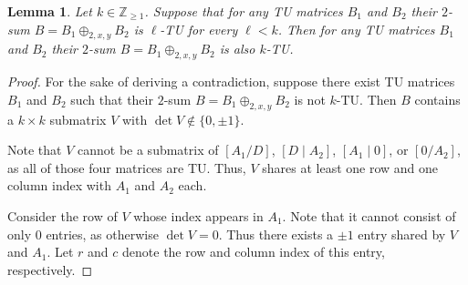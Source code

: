\documentclass{article}
\newtheorem{lemma}{Lemma}
\theoremstyle{definition}
\begin{document}
\begin{lemma}\label{lem:two_sum_k_tu_induction}
    Let $k \in \mathbb{Z}_{\geq 1}$. Suppose that for any TU matrices $B_{1}$ and $B_{2}$ their $2$-sum $B = B_{1} \oplus_{2, x, y} B_{2}$ is $\ell$-TU for every $\ell < k$. Then for any TU matrices $B_{1}$ and $B_{2}$ their $2$-sum $B = B_{1} \oplus_{2, x, y} B_{2}$ is also $k$-TU.
\end{lemma}

\begin{proof}
    For the sake of deriving a contradiction, suppose there exist TU matrices $B_{1}$ and $B_{2}$ such that their $2$-sum $B = B_{1} \oplus_{2, x, y} B_{2}$ is not $k$-TU. Then $B$ contains a $k \times k$ submatrix $V$ with $\det V \notin \{0, \pm 1\}$.

    Note that $V$ cannot be a submatrix of $\left[A_{1} / D\right]$, $\left[D \mid A_{2}\right]$, $\left[A_{1} \mid 0\right]$, or $\left[0 / A_{2}\right]$, as all of those four matrices are TU. Thus, $V$ shares at least one row and one column index with $A_{1}$ and $A_{2}$ each.

    Consider the row of $V$ whose index appears in $A_{1}$. Note that it cannot consist of only $0$ entries, as otherwise $\det V = 0$. Thus there exists a $\pm 1$ entry shared by $V$ and $A_{1}$. Let $r$ and $c$ denote the row and column index of this entry, respectively.


\end{proof}
\end{document}
